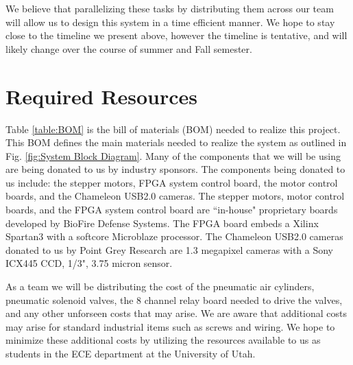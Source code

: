 \documentclass[final, letterpaper, 10 pt, conference, onecolumn]{IEEEtran}
\begin{document}
We believe that parallelizing these tasks by distributing them across our team will allow us to design this system in a time efficient manner. We hope to stay close to the timeline we present above, however the timeline is tentative, and will likely change over the course of summer and Fall semester.

\section{Required Resources}
Table \ref{table:BOM} is the bill of materials (BOM) needed to realize this project. This BOM defines the main materials needed to realize the system as outlined in Fig. \ref{fig:System Block Diagram}.
Many of the components that we will be using are being donated to us by industry sponsors. The components being donated to us include: the stepper motors, FPGA system control board, the
motor control boards, and the Chameleon USB2.0 cameras. The stepper motors, motor control boards, and the FPGA system control board are ``in-house" proprietary boards developed by BioFire Defense Systems.
The FPGA board embeds a Xilinx Spartan3 with a softcore Microblaze processor. The Chameleon USB2.0 cameras donated to us by Point Grey Research are 1.3 megapixel cameras with a Sony ICX445 CCD, 1/3", 3.75 micron sensor.

As a team we will be distributing the cost of the pneumatic air cylinders, pneumatic solenoid valves, the 8 channel relay board needed to drive the valves, and any other unforseen costs
that may arise. We are aware that additional costs may arise for standard industrial items such as screws and wiring. We hope to minimize these additional costs by utilizing the resources
available to us as students in the ECE department at the University of Utah.
\end{document}
